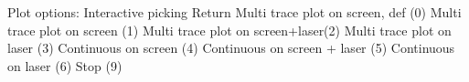 \begin{boxedverbatim}
 Plot options:           Interactive picking          Return 
                         Multi trace plot on screen, def (0) 
                         Multi trace plot on screen      (1) 
                         Multi trace plot on screen+laser(2) 
                         Multi trace plot on laser       (3) 
                         Continuous on screen            (4)
                         Continuous on screen + laser    (5)
                         Continuous on laser             (6)
                         Stop                            (9)
\end{boxedverbatim}
